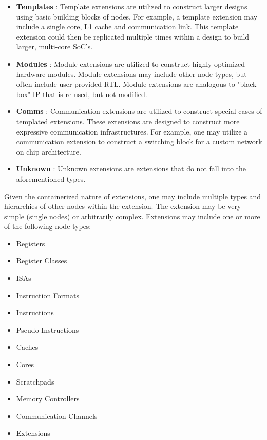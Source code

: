 \documentclass{article}
\begin{document}
\begin{itemize}
\item \textbf{Templates} : Template extensions are utilized to construct larger designs using basic building blocks of 
nodes.  For example, a template extension may include a single core, L1 cache and communication link.  This template 
extension could then be replicated multiple times within a design to build larger, multi-core SoC's.
 
\item \textbf{Modules} : Module extensions are utilized to construct highly optimized hardware modules.  Module extensions 
may include other node types, but often include user-provided RTL.  Module extensions are analogous to "black box" IP 
that is re-used, but not modified.    

\item \textbf{Comms} : Communication extensions are utilized to construct special cases of templated extensions.  These 
extensions are designed to construct more expressive communication infrastructures.  For example, one may utilize a 
communication extension to construct a switching block for a custom network on chip architecture.  

\item \textbf{Unknown} : Unknown extensions are extensions that do not fall into the aforementioned types.  
\end{itemize}

Given the containerized nature of extensions, one may include multiple types and hierarchies of other nodes 
within the extension.  The extension may be very simple (single nodes) or arbitrarily complex.  Extensions may 
include one or more of the following node types: 

\begin{itemize}
\item Registers
\item Register Classes
\item ISAs
\item Instruction Formats
\item Instructions
\item Pseudo Instructions
\item Caches
\item Cores
\item Scratchpads
\item Memory Controllers
\item Communication Channels
\item Extensions
\end{itemize}
\end{document}
